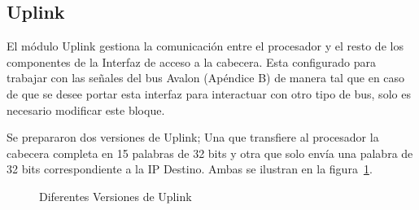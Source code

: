 \subsection{Uplink}
El módulo Uplink gestiona la comunicación entre el procesador y el resto de los componentes de la Interfaz de acceso a la cabecera. Esta configurado para trabajar con las señales del bus Avalon (Apéndice B) de manera tal que en caso de que se desee portar esta interfaz para interactuar con otro tipo de bus, solo es necesario modificar este bloque.

Se prepararon dos versiones de Uplink; Una que transfiere al procesador la cabecera completa en 15 palabras de 32 bits y otra que solo envía una palabra de 32 bits correspondiente a la IP Destino. Ambas se ilustran en la figura~\ref{fig:up151}.

\begin{figure}[H]
  \centering

   \hspace{0.1\linewidth}
  \caption{Diferentes Versiones de Uplink }
  \label{fig:up151}
\end{figure}

